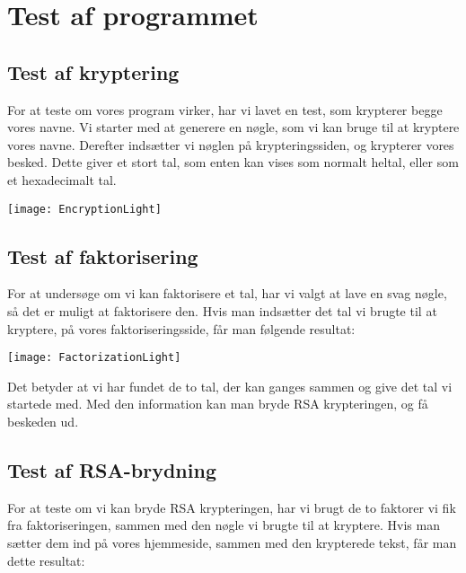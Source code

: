 \documentclass[a4paper,12pt]{extarticle}
\begin{document}
    \section{Test af programmet}\label{sec:testing}

    \subsection{Test af kryptering}\label{subsec:testing-encryption}
    For at teste om vores program virker, har vi lavet en test, som krypterer begge vores navne.
    Vi starter med at generere en nøgle, som vi kan bruge til at kryptere vores navne.
    Derefter indsætter vi nøglen på krypteringssiden, og krypterer vores besked.
    Dette giver et stort tal, som enten kan vises som normalt heltal, eller som et hexadecimalt tal.

    \begin{center}
        \texttt{[image: EncryptionLight]}\label{img:encryption}  %
    \end{center}

    \subsection{Test af faktorisering}\label{subsec:testing-factorization}
    For at undersøge om vi kan faktorisere et tal, har vi valgt at lave en svag nøgle,
    så det er muligt at faktorisere den.
    Hvis man indsætter det tal vi brugte til at kryptere, på vores faktoriseringsside, får man følgende resultat:

    \begin{center}
        \texttt{[image: FactorizationLight]}\label{img:factorization}  %
    \end{center}

    Det betyder at vi har fundet de to tal, der kan ganges sammen og give det tal vi startede med.
    Med den information kan man bryde RSA krypteringen, og få beskeden ud.

    \subsection{Test af RSA-brydning}\label{subsec:testing-cracking}
    For at teste om vi kan bryde RSA krypteringen, har vi brugt de to faktorer vi fik fra faktoriseringen,
    sammen med den nøgle vi brugte til at kryptere.
    Hvis man sætter dem ind på vores hjemmeside, sammen med den krypterede tekst, får man dette resultat:
\end{document}
